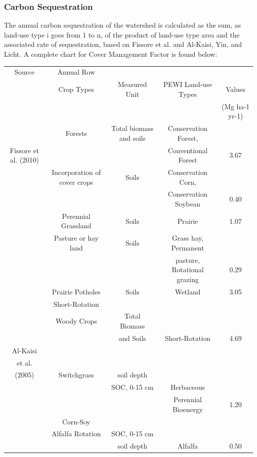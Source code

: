 \documentclass[11pt]{article}
\begin{document}
\subsubsection{Carbon Sequestration}
The annual carbon sequestration of the watershed is calculated as the sum, as land-use type i goes from 1 to n, of the product of land-use type area and the associated rate of sequestration, based on Fissore et al. and Al-Kaisi, Yin, and Licht.\cite{37} 
A complete chart for Cover Management Factor is found below:
\begin{center}
\begin{tabular}{ |c|c|c|c|c| } 
\hline
Source & Annual Row\\
& Crop Types & Measured Unit & PEWI Land-use Types
& Values \\
& & & & (Mg ha-1 yr-1) \\
\hline
\multirow{3}{3em}{Fissore et al. (2010)} & Forests & Total biomass and soils & Conservation Forest, \\
& & & Conventional Forest & 3.67 \\ 

& Incorporation of cover crops 
& Soils & Conservation Corn, \\
& & & Conservation Soybean & 0.40\\ 
\hline

& Perennial Grassland 
& Soils & Prairie & 1.07\\ 
\hline

& Pasture or hay land 
& Soils & Grass hay, Permanent \\
& & &  pasture, Rotational grazing & 0.29\\
\hline

& Prairie Potholes
& Soils & Wetland & 3.05\\
\hline

& Short-Rotation \\
& Woody Crops & Total Biomass \\
& & and Soils & Short-Rotation & 4.69 \\
\hline
 
Al-Kaisi \\
et al.\\
(2005) & Switchgrass & soil depth \\ [-0.43 in]
& & SOC, 0-15 cm & Herbaceous\\
& & & Perennial Bioenergy & 1.20 \\
\hline

& Corn-Soy \\
& Alfalfa Rotation & SOC, 0-15 cm \\
& & soil depth & Alfalfa & 0.50 \\
\hline
\end{tabular}
\end{center}
 
\end{document}
